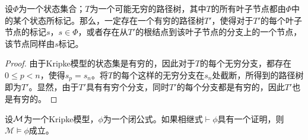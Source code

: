 \begin{proposition}[可能无穷的路径树到有穷路径树]\label{prop:ift}
	设$\Phi$为一个状态集合；$T$为一个可能无穷的路径树，其中$T$的所有叶子节点都由$\Phi$中的某个状态所标记。那么，一定存在一个有穷的路径树$T'$，使得对于$T'$的每个叶子节点的标记$s$，$s\in\Phi$，或者存在从$T'$的根结点到该叶子节点的分支上的一个节点，该节点同样由$s$标记。
\end{proposition}
\begin{proof}
	由于Kripke模型的状态集是有穷的，因此对于$T$的每个无穷分支，都存在$0\le p<n$，使得$s_p=s_n$。将$T$的每个这样的无穷分支在$s_n$处截断，所得到的路径树即为$T'$。显然，由于$T'$具有有穷个分支，同时$T'$的每个分支都是有穷的，因此$T'$也是有穷的。
\end{proof}

\begin{theorem}[有效性]\label{thm:sound}
	设$\cal M$为一个Kripke模型，$\phi$为一个\ctlpm{}闭公式。如果相继式$\vdash\phi$具有一个证明，则$\mathcal{M}\models\phi$成立。
\end{theorem}

